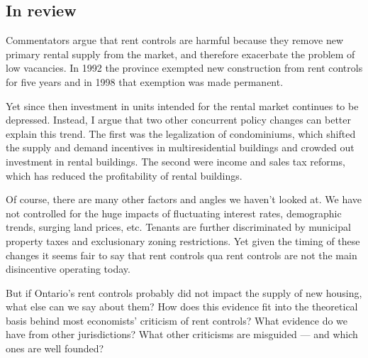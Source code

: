 \subsection{In review}

Commentators argue that rent controls are harmful because they remove new primary rental supply from the market, and therefore exacerbate the problem of low vacancies. In 1992 the province exempted new construction from rent controls for five years and in 1998 that exemption was made permanent.

Yet since then investment in units intended for the rental market continues to be depressed. Instead, I argue that two other concurrent policy changes can better explain this trend. The first was the legalization of condominiums, which shifted the supply and demand incentives in multiresidential buildings and crowded out investment in rental buildings. The second were income and sales tax reforms, which has reduced the profitability of rental buildings.

Of course, there are many other factors and angles we haven't looked at. We have not controlled for the huge impacts of fluctuating interest rates, demographic trends, surging land prices, etc. Tenants are further discriminated by municipal property taxes and exclusionary zoning restrictions. Yet given the timing of these changes it seems fair to say that rent controls qua rent controls are not the main disincentive operating today.

But if Ontario's rent controls probably did not impact the supply of new housing, what else can we say about them? How does this evidence fit into the theoretical basis behind most economists' criticism of rent controls? What evidence do we have from other jurisdictions? What other criticisms are misguided — and which ones are well founded?
